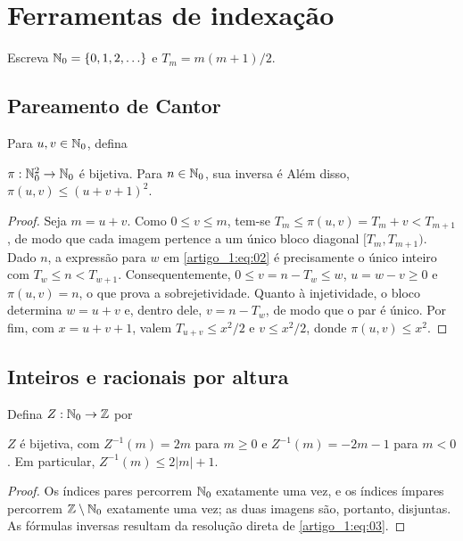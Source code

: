 \section{Ferramentas de indexação}
Escreva $\mathbb N_0=\{0,1,2,\ldots\}$ e $T_m=m(m+1)/2$.

\subsection{Pareamento de Cantor}
Para $u,v\in\mathbb N_0$, defina
\begin{lema}\label{map:artigo_1:2.1}
$\pi:\mathbb N_0^2\to\mathbb N_0$ é bijetiva. Para $n\in\mathbb N_0$, sua inversa é
Além disso, $\pi(u,v)\le(u+v+1)^2$.
\end{lema}
\begin{proof}
Seja $m=u+v$. Como $0\le v\le m$, tem-se $T_m\le\pi(u,v)=T_m+v<T_{m+1}$, de modo que cada imagem pertence a um único bloco diagonal $[T_m,T_{m+1})$. Dado $n$, a expressão para $w$ em \eqref{artigo_1:eq:02} é precisamente o único inteiro com $T_w\le n<T_{w+1}$. Consequentemente, $0\le v=n-T_w\le w$, $u=w-v\ge0$ e $\pi(u,v)=n$, o que prova a sobrejetividade. Quanto à injetividade, o bloco determina $w=u+v$ e, dentro dele, $v=n-T_w$, de modo que o par é único. Por fim, com $x=u+v+1$, valem $T_{u+v}\le x^2/2$ e $v\le x^2/2$, donde $\pi(u,v)\le x^2$.
\end{proof}

\subsection{Inteiros e racionais por altura}
Defina $Z:\mathbb N_0\to\mathbb Z$ por
\begin{lema}\label{map:artigo_1:2.2}
$Z$ é bijetiva, com $Z^{-1}(m)=2m$ para $m\ge0$ e $Z^{-1}(m)=-2m-1$ para $m<0$. Em particular, $Z^{-1}(m)\le2|m|+1$.
\end{lema}
\begin{proof}
Os índices pares percorrem $\mathbb N_0$ exatamente uma vez, e os índices ímpares percorrem $\mathbb Z\setminus\mathbb N_0$ exatamente uma vez; as duas imagens são, portanto, disjuntas. As fórmulas inversas resultam da resolução direta de \eqref{artigo_1:eq:03}.
\end{proof}

